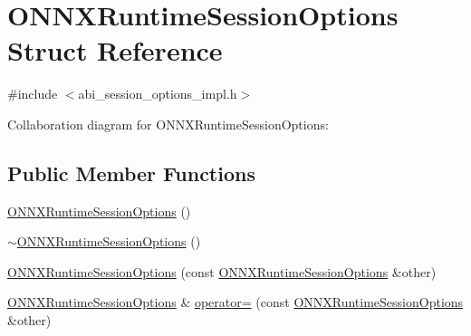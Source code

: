 \hypertarget{structONNXRuntimeSessionOptions}{}\section{O\+N\+N\+X\+Runtime\+Session\+Options Struct Reference}
\label{structONNXRuntimeSessionOptions}


{\ttfamily \#include $<$abi\+\_\+session\+\_\+options\+\_\+impl.\+h$>$}



Collaboration diagram for O\+N\+N\+X\+Runtime\+Session\+Options\+:
\subsection*{Public Member Functions}
\begin{DoxyCompactItemize}
\item 
\mbox{\hyperlink{structONNXRuntimeSessionOptions_a637c3e62320545025e31565cfc2a9884}{O\+N\+N\+X\+Runtime\+Session\+Options}} ()
\item 
\mbox{\hyperlink{structONNXRuntimeSessionOptions_ac22988fc9b79e046529afd5099e42114}{$\sim$\+O\+N\+N\+X\+Runtime\+Session\+Options}} ()
\item 
\mbox{\hyperlink{structONNXRuntimeSessionOptions_a159f30d6fad9017b2323ef62ba3fa544}{O\+N\+N\+X\+Runtime\+Session\+Options}} (const \mbox{\hyperlink{structONNXRuntimeSessionOptions}{O\+N\+N\+X\+Runtime\+Session\+Options}} \&other)
\item 
\mbox{\hyperlink{structONNXRuntimeSessionOptions}{O\+N\+N\+X\+Runtime\+Session\+Options}} \& \mbox{\hyperlink{structONNXRuntimeSessionOptions_a7f3993692b42a9bd63044a42d1749a2a}{operator=}} (const \mbox{\hyperlink{structONNXRuntimeSessionOptions}{O\+N\+N\+X\+Runtime\+Session\+Options}} \&other)
\end{DoxyCompactItemize}
